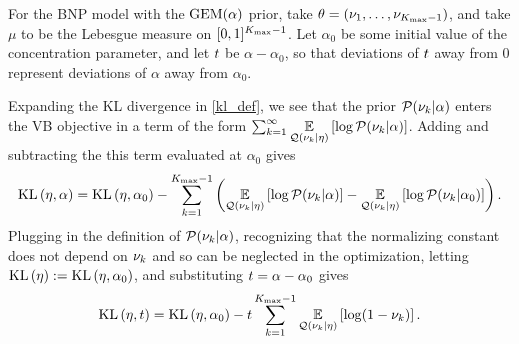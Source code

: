 \begin{ex}
%
For the BNP model with the $\mathrm{GEM}(\alpha)$ prior, take $\theta = (\nu_1, \ldots,
\nu_{{K_{\mathrm{max}}}-1})$, and take $\mu$ to be the Lebesgue measure on $[0,1]^{{K_{\mathrm{max}}}-1}$.
Let $\alpha_0$ be some initial value of the concentration parameter, and
let $t$ be $\alpha - \alpha_0$, so that deviations of $t$ away from
$0$ represent deviations of $\alpha$ away from $\alpha_0$.

Expanding the KL divergence in \eqref{kl_def}, we see that the prior
$\mathcal{P}(\nu_{k} \vert \alpha)$ enters the VB objective in a term of the form
$\sum_{k=1}^\infty \underset{\mathcal{Q}(\nu_{k} \vert \eta)}{\mathbb{E}}\left[\log \mathcal{P}(\nu_{k} \vert \alpha)\right]$.
Adding and subtracting the this term evaluated at $\alpha_0$ gives
%
\begin{align*}
%
\KL{\eta, \alpha} = \KL{\eta, \alpha_0}
-\sum_{\k=1}^{\kmax - 1}
            \left(
                \expect{\q(\nuk \vert \eta)}{\log \p(\nuk \vert \alpha)} -
                \expect{\q(\nuk \vert \eta)}{\log \p(\nuk \vert \alpha_0)}
             \right).
%
\end{align*}
%
Plugging in the definition of $\mathcal{P}(\nu_{k} \vert \alpha)$, recognizing that the
normalizing constant does not depend on $\nu_{k}$ and so can be neglected in the
optimization, letting $\mathrm{KL}\left(\eta\right) := \mathrm{KL}\left(\eta, \alpha_0\right)$, and substituting $t =
\alpha - \alpha_0$ gives
%
\begin{align*}
%
\KL{\eta, \t} = \KL{\eta, \alpha_0}
-\t \sum_{\k=1}^{\kmax - 1}
    \expect{\q(\nuk \vert \eta)}{\log (1 - \nuk)}.
%
\end{align*}
%
\end{ex}



